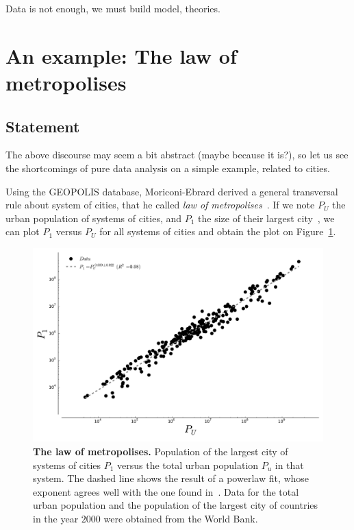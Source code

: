 Data is not enough, we must build model, theories.

\section{An example: The law of metropolises}
\label{sec:an_example_the_law_of_metropolises}

\subsection{Statement}
\label{sub:statement}

The above discourse may seem a bit abstract (maybe because it is?), so let us
see the shortcomings of pure data analysis on a simple example, related to
cities.

Using the GEOPOLIS database, Moriconi-Ebrard derived a general transversal rule about system
of cities, that he called \emph{law of metropolises}~\cite{Pumain:1997}. If we
note $P_U$ the urban population of systems of cities, and $P_1$ the size of
their largest city~, we can
plot $P_1$ versus $P_U$ for all systems of cities and obtain the plot on
Figure~\ref{fig:metropolises}.

\begin{figure}[!h]
    \centering
    \includegraphics[width=\textwidth]{gfx/chapter-intro/law_metropolises.pdf}
    \caption{{\bf The law of metropolises.} Population of the largest city of
    systems of cities $P_1$ versus the total urban population $P_u$ in that
system. The dashed line shows the result of a powerlaw fit, whose exponent
agrees well with the one found in~\cite{Pumain:1997}. Data for the total urban
population and the population of the largest city of countries in the year
$2000$ were obtained from
the World Bank.\label{fig:metropolises}}
\end{figure}

